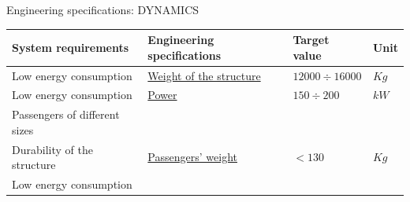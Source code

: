 \documentclass{beamer}              %
\begin{document}
	\begin{frame}{Engineering specifications: DYNAMICS}		
		\centering
		
		\tiny	
		\begin{center}
			\begin{tabular}{p{3 cm} p{3 cm} p{2 cm} p{0.5 cm}}
				\toprule
				\textbf{System requirements} &\textbf{Engineering specifications} &\textbf{Target value} &\textbf{Unit} \\
				\toprule		
				Low energy consumption & \hyperlink{2}{Weight of the structure} &$12000\div16000$ & $Kg$  \\ 				
				\midrule		
				Low energy consumption& \hyperlink{10}{Power} & $150\div200$ & $kW$ \\					
				\midrule				
				Passengers of different sizes  & & & \\
				Durability of the structure&\hyperlink{9}{Passengers' weight}  & $<130$ & $Kg$\\
				Low energy consumption&&&\\
				
				\bottomrule
			\end{tabular}
		\end{center}	
	\end{frame}
\end{document}
